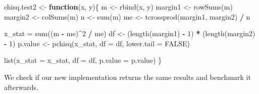 \documentclass[
]{krantz}
\makeatletter
\newenvironment{Shaded}{\begin{snugshade}}{\end{snugshade}}
\newcommand{\ControlFlowTok}[1]{\textcolor[rgb]{0.13,0.29,0.53}{\textbf{#1}}}
\newcommand{\DataTypeTok}[1]{\textcolor[rgb]{0.13,0.29,0.53}{#1}}
\newcommand{\DecValTok}[1]{\textcolor[rgb]{0.00,0.00,0.81}{#1}}
\newcommand{\KeywordTok}[1]{\textcolor[rgb]{0.13,0.29,0.53}{\textbf{#1}}}
\newcommand{\NormalTok}[1]{#1}
\newcommand{\OperatorTok}[1]{\textcolor[rgb]{0.81,0.36,0.00}{\textbf{#1}}}
\newcommand{\OtherTok}[1]{\textcolor[rgb]{0.56,0.35,0.01}{#1}}
\newcommand{\StringTok}[1]{\textcolor[rgb]{0.31,0.60,0.02}{#1}}
\newenvironment{kframe}{%
\medskip{}
\setlength{\fboxsep}{.8em}
 \def\at@end@of@kframe{}%
 \ifinner\ifhmode%
  \def\at@end@of@kframe{\end{minipage}}%
  \begin{minipage}{\columnwidth}%
 \fi\fi%
 \def\FrameCommand##1{\hskip\@totalleftmargin \hskip-\fboxsep
 \colorbox{shadecolor}{##1}\hskip-\fboxsep
     \hskip-\linewidth \hskip-\@totalleftmargin \hskip\columnwidth}%
 \MakeFramed {\advance\hsize-\width
   \@totalleftmargin\z@ \linewidth\hsize
   \@setminipage}}%
 {\par\unskip\endMakeFramed%
 \at@end@of@kframe}
\renewenvironment{Shaded}{\begin{kframe}}{\end{kframe}}
\renewcommand{\KeywordTok} [1]{\textcolor[rgb]{0.00,0.44,0.13}{{#1}}}
\renewcommand{\DataTypeTok}[1]{\textcolor[rgb]{0.56,0.13,0.00}{{#1}}}
\renewcommand{\DecValTok}  [1]{\textcolor[rgb]{0.25,0.63,0.44}{{#1}}}
\renewcommand{\StringTok}  [1]{\textcolor[rgb]{0.25,0.44,0.63}{{#1}}}
\renewcommand{\OtherTok}   [1]{\textcolor[rgb]{0.00,0.44,0.13}{{#1}}}
\renewcommand{\NormalTok}  [1]{{#1}}
\makeatother
\begin{document}
\begin{Shaded}
\begin{Highlighting}[]
\NormalTok{chisq.test2 <-}\StringTok{ }\ControlFlowTok{function}\NormalTok{(x, y)\{}
\NormalTok{  m <-}\StringTok{ }\KeywordTok{rbind}\NormalTok{(x, y)}
\NormalTok{  margin1 <-}\StringTok{ }\KeywordTok{rowSums}\NormalTok{(m)}
\NormalTok{  margin2 <-}\StringTok{ }\KeywordTok{colSums}\NormalTok{(m)}
\NormalTok{  n <-}\StringTok{ }\KeywordTok{sum}\NormalTok{(m)}
\NormalTok{  me <-}\StringTok{ }\KeywordTok{tcrossprod}\NormalTok{(margin1, margin2) }\OperatorTok{/}\StringTok{ }\NormalTok{n}
  
\NormalTok{  x_stat =}\StringTok{ }\KeywordTok{sum}\NormalTok{((m }\OperatorTok{-}\StringTok{ }\NormalTok{me)}\OperatorTok{^}\DecValTok{2} \OperatorTok{/}\StringTok{ }\NormalTok{me)}
\NormalTok{  df <-}\StringTok{ }\NormalTok{(}\KeywordTok{length}\NormalTok{(margin1) }\OperatorTok{-}\StringTok{ }\DecValTok{1}\NormalTok{) }\OperatorTok{*}\StringTok{ }\NormalTok{(}\KeywordTok{length}\NormalTok{(margin2) }\OperatorTok{-}\StringTok{ }\DecValTok{1}\NormalTok{)}
\NormalTok{  p.value <-}\StringTok{ }\KeywordTok{pchisq}\NormalTok{(x_stat, }\DataTypeTok{df =}\NormalTok{ df, }\DataTypeTok{lower.tail =} \OtherTok{FALSE}\NormalTok{)}
  
  \KeywordTok{list}\NormalTok{(}\DataTypeTok{x_stat =}\NormalTok{ x_stat, }\DataTypeTok{df =}\NormalTok{ df, }\DataTypeTok{p.value =}\NormalTok{ p.value)}
\NormalTok{\}}
\end{Highlighting}
\end{Shaded}

We check if our new implementation returns the same results and benchmark it afterwards.
\end{document}
